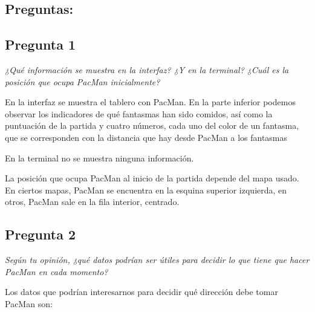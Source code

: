 \documentclass[12pt]{article}
\begin{document}
\tableofcontents

\newpage

\begin{center}
\section{Preguntas:}

\subsection{Pregunta 1}

\emph{¿Qué información se muestra en la interfaz? ¿Y en la terminal? ¿Cuál es la
posición que ocupa PacMan inicialmente?}\\
\end{center}

En la interfaz se muestra el tablero con PacMan. En la parte inferior podemos
observar los indicadores de qué fantasmas han sido comidos, así como la
puntuación de la partida y cuatro números, cada uno del color de un fantasma,
que se corresponden con la distancia que hay desde PacMan a los fantasmas

En la terminal no se muestra ninguna información.

La posición que ocupa PacMan al inicio de la partida depende del mapa usado. En
ciertos mapas, PacMan se encuentra en la esquina superior izquierda, en otros,
PacMan sale en la fila interior, centrado.


\newpage
\begin{center}
\subsection{Pregunta 2}

\emph{Según tu opinión, ¿qué datos podrían ser útiles para decidir lo que tiene
que hacer PacMan en cada momento?}\\
\end{center}

Los datos que podrían interesarnos para decidir qué dirección debe tomar
PacMan son:
\end{document}
